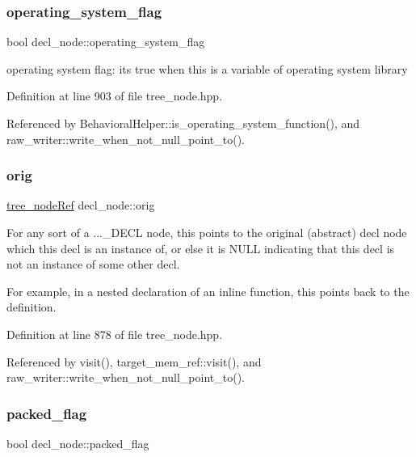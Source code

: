 \subsubsection{\texorpdfstring{operating\+\_\+system\+\_\+flag}{operating\_system\_flag}}
{\footnotesize\ttfamily bool decl\+\_\+node\+::operating\+\_\+system\+\_\+flag}



operating system flag\+: it\textquotesingle{}s true when this is a variable of operating system library 



Definition at line 903 of file tree\+\_\+node.\+hpp.



Referenced by Behavioral\+Helper\+::is\+\_\+operating\+\_\+system\+\_\+function(), and raw\+\_\+writer\+::write\+\_\+when\+\_\+not\+\_\+null\+\_\+point\+\_\+to().

\mbox{\label{structdecl__node_ac29105ad772962c0ecba4977823370bf}} 
\subsubsection{\texorpdfstring{orig}{orig}}
{\footnotesize\ttfamily \hyperlink{tree__node_8hpp_a6ee377554d1c4871ad66a337eaa67fd5}{tree\+\_\+node\+Ref} decl\+\_\+node\+::orig}



For any sort of a ...\+\_\+\+D\+E\+CL node, this points to the original (abstract) decl node which this decl is an instance of, or else it is N\+U\+LL indicating that this decl is not an instance of some other decl. 

For example, in a nested declaration of an inline function, this points back to the definition. 

Definition at line 878 of file tree\+\_\+node.\+hpp.



Referenced by visit(), target\+\_\+mem\+\_\+ref\+::visit(), and raw\+\_\+writer\+::write\+\_\+when\+\_\+not\+\_\+null\+\_\+point\+\_\+to().

\mbox{\label{structdecl__node_aae0dddaa904bf9367a4d045df78d7a3e}} 
\subsubsection{\texorpdfstring{packed\+\_\+flag}{packed\_flag}}
{\footnotesize\ttfamily bool decl\+\_\+node\+::packed\+\_\+flag}



